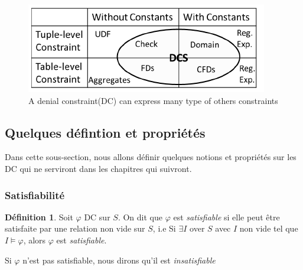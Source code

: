 \documentclass[letterpaper, 12pt]{report}
\theoremstyle{definition}
\newtheorem{mydef}{Définition}
\begin{document}
 
\begin{figure}
	\centering
	\includegraphics[scale=1]{img/quadran.png}
	\caption{A denial constraint(DC) can express many type of others constraints}
\end{figure}


\subsection{Quelques défintion et propriétés}

Dans cette sous-section, nous allons définir quelques notions et propriétés sur les DC qui ne serviront dans les chapitres qui suivront.
\subsubsection{Satisfiabilité}

\begin{mydef}
Soit $\varphi$ DC sur $S$. On dit que $\varphi$ est \emph{satisfiable} si elle peut être satisfaite par une relation non vide sur $S$, i.e Si $\exists I$ over $S$ avec $I$ non vide tel que $I \models \varphi$, alors $\varphi$ est \emph{satisfiable}.

Si $\varphi$ n'est pas satisfiable, nous dirons qu'il est \emph{insatisfiable} 
\end{mydef}
\end{document}

